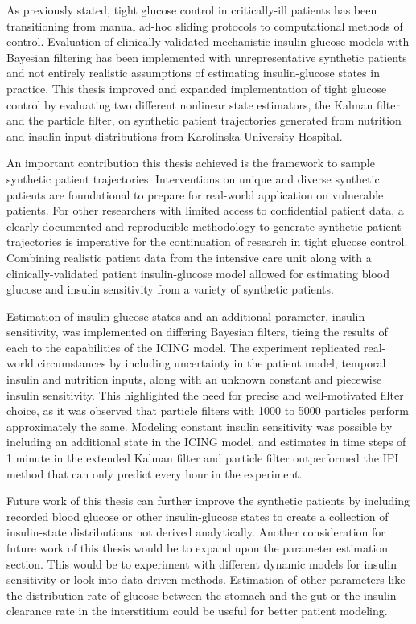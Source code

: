 \documentclass[nomenclature, english, bibtex]{kththesis}
\begin{document}
As previously stated, tight glucose control in critically-ill patients has been transitioning from manual ad-hoc sliding protocols to computational methods of control. Evaluation of clinically-validated mechanistic insulin-glucose models with Bayesian filtering has been implemented with unrepresentative synthetic patients and not entirely realistic assumptions of estimating insulin-glucose states in practice. This thesis improved and expanded implementation of tight glucose control by evaluating two different nonlinear state estimators, the Kalman filter and the particle filter, on synthetic patient trajectories generated from nutrition and insulin input distributions from Karolinska University Hospital.

An important contribution this thesis achieved is the framework to sample synthetic patient trajectories. Interventions on unique and diverse synthetic patients are foundational to prepare for real-world application on vulnerable patients. For other researchers with limited access to confidential patient data, a clearly documented and reproducible methodology to generate synthetic patient trajectories is imperative for the continuation of research in tight glucose control. Combining realistic patient data from the intensive care unit along with a clinically-validated patient insulin-glucose model allowed for estimating blood glucose and insulin sensitivity from a variety of synthetic patients.

Estimation of insulin-glucose states and an additional parameter, insulin sensitivity, was implemented on differing Bayesian filters, tieing the results of each to the capabilities of the \gls{ICING} model. The experiment replicated real-world circumstances by including uncertainty in the patient model, temporal insulin and nutrition inputs, along with an unknown constant and piecewise insulin sensitivity. This highlighted the need for precise and well-motivated filter choice, as it was observed that particle filters with 1000 to 5000 particles perform approximately the same. Modeling constant insulin sensitivity was possible by including an additional state in the \gls{ICING} model, and estimates in time steps of 1 minute in the extended Kalman filter and particle filter outperformed the \gls{IPI} method that can only predict every hour in the experiment.

Future work of this thesis can further improve the synthetic patients by including recorded blood glucose or other insulin-glucose states to create a collection of insulin-state distributions not derived analytically. Another consideration for future work of this thesis would be to expand upon the parameter estimation section. This would be to experiment with different dynamic models for insulin sensitivity or look into data-driven methods. Estimation of other parameters like the distribution rate of glucose between the stomach and the gut or the insulin clearance rate in the interstitium could be useful for better patient modeling.
\end{document}
